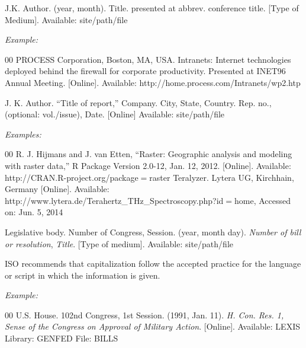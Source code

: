 \documentclass{ieeetmlcn}
\begin{document}

\noindent J.K. Author. (year, month). Title. presented at abbrev. conference title.
[Type of Medium]. Available: site/path/file

{\it Example:}

\begin{thebibliography}{00}
 PROCESS Corporation, Boston, MA, USA. Intranets: Internet technologies deployed behind the firewall for corporate productivity. Presented at INET96 Annual Meeting. [Online]. Available:  {http://home.process.com/Intranets/wp2.htp}
\end{thebibliography}


\noindent J. K. Author. ``Title of report,'' Company. City, State, Country. Rep. no.,
(optional: vol./issue), Date. [Online] Available:
{site/path/file}

{\it Examples:}

\begin{thebibliography}{00}
 R. J. Hijmans and J. van Etten, ``Raster: Geographic analysis and modeling with raster data,'' R Package Version 2.0-12, Jan. 12, 2012. [Online]. Available:  {http://CRAN.R-project.org/package$=$raster} {}
 Teralyzer. Lytera UG, Kirchhain, Germany [Online]. Available: http://www.lytera.de/Terahertz\_THz\_Spectroscopy.php?id$=$home, Accessed on: Jun. 5, 2014
\end{thebibliography}


\noindent Legislative body. Number of Congress, Session. (year, month day). {\it Number of bill or resolution}, {\it Title}. [Type
of medium]. Available: site/path/file

 ISO recommends that capitalization follow the accepted
practice for the language or script in which the information is given.



{\it Example:}

\begin{thebibliography}{00}
 U.S. House. 102nd Congress, 1st Session. (1991, Jan. 11). {\it H. Con. Res. 1, Sense of the Congress on Approval of Military Action}. [Online]. Available: LEXIS Library: GENFED File: BILLS
\end{thebibliography}
\end{document}
